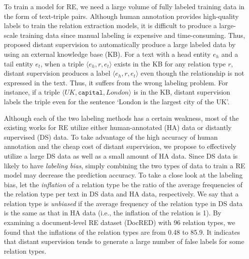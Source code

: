 \documentclass[11pt]{article}
\newcommand{\triple}[3]{\ensuremath{\langle #1,#2,#3\rangle}}
\newcommand{\head}{$e_{h}$\xspace}
\newcommand{\tail}{$e_{t}$\xspace}
\newcommand{\ehead}{e_{h}}
\newcommand{\etail}{e_{t}}
\newcommand{\relationt}[1]{\texttt{#1}}
\begin{document}

To train a model for RE, we need a large volume of fully labeled training data in the form of text-triple pairs.
Although human annotation provides high-quality labels to train the relation extraction models, it is difficult to produce a large-scale training data since manual labeling is expensive and time-consuming.
Thus,  proposed distant supervision to automatically produce a large labeled data by using an external knowledge base (KB).
For a text with a head entity \head and a tail entity \tail, when a triple \triple{\ehead}{r}{\etail} exists in the KB for any relation type $r$, distant supervision produces a label \triple{\ehead}{r}{\etail} even though the relationship is not expressed in the text.
Thus, it suffers from the wrong labeling problem.
For instance, if a triple \triple{UK}{\relationt{capital}}{London} is in the KB, distant supervision labels the triple 
even for the sentence `London is the largest city of the UK'.


Although each of the two labeling methods has a certain weakness, most of the existing works for RE utilize either human-annotated (HA) data or distantly supervised (DS) data.
To take advantage of the high accuracy of human annotation and the cheap cost of distant supervision, we propose to effectively utilize a large DS data as well as a small amount of HA data.
Since DS data is likely to have \emph{labeling bias}, simply combining the two types of data to train a RE model may decrease the prediction accuracy.
To take a close look at the labeling bias, let the \emph{inflation} of a relation type be the ratio of the average frequencies of the relation type per text in DS data and HA data, respectively.
We say that a relation type is \emph{unbiased} if the average frequency of the relation type in DS data is the same as that in HA data (i.e., the inflation of the relation is 1).
By examining a document-level RE dataset (DocRED) \cite{yao2019docred} with 96 relation types, we found that the inflations of the relation types are from 0.48 to 85.9.
It indicates that distant supervision tends to generate a large number of false labels for some relation types.
\end{document}

